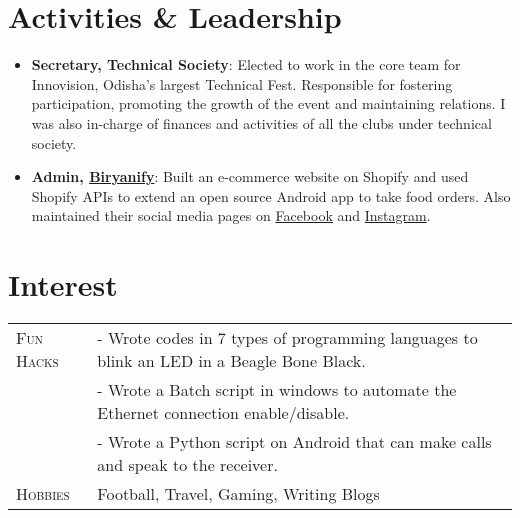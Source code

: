 \documentclass[a4paper,10pt]{extarticle} %
\begin{document}
\vspace{-0.6cm}
\section{\textcolor{primary}{Activities \& Leadership}}

\begin{itemize}[leftmargin=0.55cm, rightmargin=0.2cm, label={\Large\textbullet}]
\item \textbf{Secretary, {Technical Society}}: 
Elected to work in the core team for Innovision, Odisha's largest Technical Fest. Responsible for fostering participation, promoting the growth of the event and maintaining relations. I was also in-charge of finances and activities of all the clubs under technical society.

\item \textbf{Admin, \href{https://www.biryanify.com}{Biryanify}}: Built an e-commerce website on Shopify and used Shopify APIs to extend an open source Android app to take food orders. Also maintained their social media pages on \href{https://www.facebook.com/biryanify}{Facebook} and \href{https://www.instagram.com/biryanify/}{Instagram}.
\end{itemize}

\vspace{-0.15cm}
\section{\textcolor{primary}{Interest}}
\begin{tabularx}{\linewidth}{ l | X }
\textsc{Fun Hacks} & {- Wrote codes in 7 types of programming languages to blink an LED in a Beagle Bone Black. }\\
& {- Wrote a Batch script in windows to automate the Ethernet connection enable/disable. }\\
& {- Wrote a Python script on Android that can make calls and speak to the receiver.  }\\

\textsc{Hobbies} & {Football, Travel, Gaming, Writing Blogs}\\


\end{tabularx}
\end{document}
